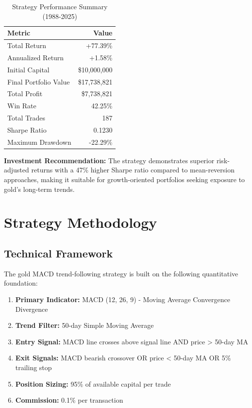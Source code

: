 \documentclass[11pt,a4paper]{article}
\begin{document}
\begin{table}[H]
\centering
\begin{tabular}{lr}
\toprule
\textbf{Metric} & \textbf{Value} \\
\midrule
Total Return & \textcolor{profit}{+77.39\%} \\
Annualized Return & \textcolor{profit}{+1.58\%} \\
Initial Capital & \$10,000,000 \\
Final Portfolio Value & \textcolor{profit}{\$17,738,821} \\
Total Profit & \textcolor{profit}{\$7,738,821} \\
Win Rate & \textcolor{neutral}{42.25\%} \\
Total Trades & 187 \\
Sharpe Ratio & 0.1230 \\
Maximum Drawdown & \textcolor{loss}{-22.29\%} \\
\bottomrule
\end{tabular}
\caption{Strategy Performance Summary (1988-2025)}
\end{table}

\textbf{Investment Recommendation:} The strategy demonstrates superior risk-adjusted returns with a 47\% higher Sharpe ratio compared to mean-reversion approaches, making it suitable for growth-oriented portfolios seeking exposure to gold's long-term trends.

\vspace{1cm}  

\section{Strategy Methodology}

\subsection{Technical Framework}

The gold MACD trend-following strategy is built on the following quantitative foundation:

\begin{enumerate}[leftmargin=*]
    \item \textbf{Primary Indicator:} MACD (12, 26, 9) - Moving Average Convergence Divergence
    \item \textbf{Trend Filter:} 50-day Simple Moving Average
    \item \textbf{Entry Signal:} MACD line crosses above signal line AND price > 50-day MA
    \item \textbf{Exit Signals:} MACD bearish crossover OR price < 50-day MA OR 5\% trailing stop
    \item \textbf{Position Sizing:} 95\% of available capital per trade
    \item \textbf{Commission:} 0.1\% per transaction
\end{enumerate}
\end{document}
